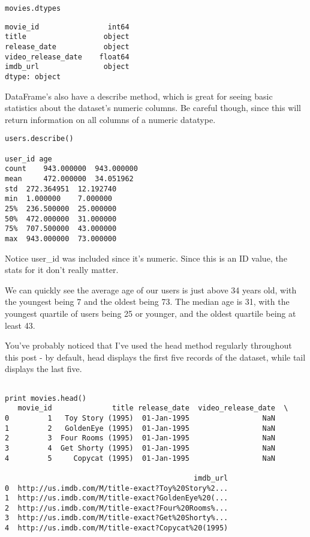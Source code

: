 \begin{framed}
\begin{verbatim}
movies.dtypes
\end{verbatim}
\begin{framed}
\begin{verbatim}
movie_id                int64
title                  object
release_date           object
video_release_date    float64
imdb_url               object
dtype: object
\end{verbatim}

DataFrame's also have a describe method, which is great for seeing basic statistics about the dataset's numeric columns. Be careful though, since this will return information on all columns of a numeric datatype.

\begin{verbatim}
users.describe()

user_id	age
count	 943.000000	 943.000000
mean	 472.000000	 34.051962
std	 272.364951	 12.192740
min	 1.000000	 7.000000
25%	 236.500000	 25.000000
50%	 472.000000	 31.000000
75%	 707.500000	 43.000000
max	 943.000000	 73.000000
\end{verbatim}
Notice user\_id was included since it's numeric. Since this is an ID value, the stats for it don't really matter.

We can quickly see the average age of our users is just above 34 years old, with the youngest being 7 and the oldest being 73. The median age is 31, with the youngest quartile of users being 25 or younger, and the oldest quartile being at least 43.

You've probably noticed that I've used the head method regularly throughout this post - by default, head displays the first five records of the dataset, while tail displays the last five.
\begin{framed}
\begin{verbatim}

print movies.head()
   movie_id              title release_date  video_release_date  \
0         1   Toy Story (1995)  01-Jan-1995                 NaN   
1         2   GoldenEye (1995)  01-Jan-1995                 NaN   
2         3  Four Rooms (1995)  01-Jan-1995                 NaN   
3         4  Get Shorty (1995)  01-Jan-1995                 NaN   
4         5     Copycat (1995)  01-Jan-1995                 NaN   

                                            imdb_url  
0  http://us.imdb.com/M/title-exact?Toy%20Story%2...  
1  http://us.imdb.com/M/title-exact?GoldenEye%20(...  
2  http://us.imdb.com/M/title-exact?Four%20Rooms%...  
3  http://us.imdb.com/M/title-exact?Get%20Shorty%...  
4  http://us.imdb.com/M/title-exact?Copycat%20(1995)  
\end{verbatim} 


\end{framed}
\end{framed}
\end{framed}
